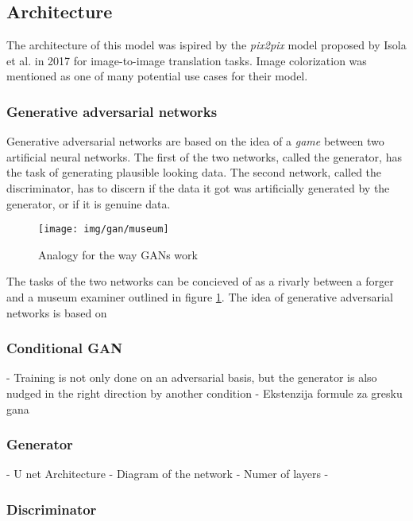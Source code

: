 \subsection{Architecture}

The architecture of this model was ispired by the \textit{pix2pix} model proposed
by Isola et al. in 2017 for image-to-image translation tasks. Image colorization
was mentioned as one of many potential use cases for their model.

\subsubsection{Generative adversarial networks}

Generative adversarial networks are based on the idea of a \textit{game} between
two artificial neural networks. The first of the two networks, called the generator, 
has the task of generating plausible looking data. The second network, called the
discriminator, has to discern if the data it got was artificially generated by the
generator, or if it is genuine data.

\begin{figure}[!ht]
	\centering
	\texttt{[image: img/gan/museum]}
    \caption{Analogy for the way GANs work}
	\label{fig:museum}
\end{figure}

The tasks of the two networks can be concieved of as a rivarly between a forger
and a museum examiner outlined in figure \ref{fig:museum}.
The idea of generative adversarial networks is based on 


\subsubsection{Conditional GAN}

- Training is not only done on an adversarial basis, but the generator is also nudged in the right direction by another condition
- Ekstenzija formule za gresku gana

\subsubsection{Generator}

- U net Architecture
- Diagram of the network
- Numer of layers
- 

\subsubsection{Discriminator}

